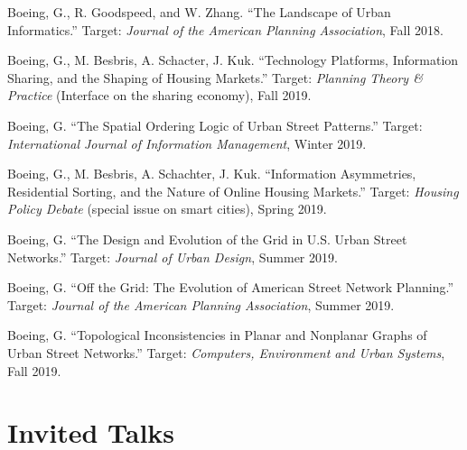 \documentclass[12pt,letterpaper]{report}
\begin{document}
\begin{tablist}

\item[\the\year] \tab Boeing, G., R. Goodspeed, and W. Zhang. \enquote{The Landscape of Urban Informatics.} Target: \textit{Journal of the American Planning Association}, Fall 2018.

\item[\the\year] \tab Boeing, G., M. Besbris, A. Schacter, J. Kuk. \enquote{Technology Platforms, Information Sharing, and the Shaping of Housing Markets.} Target: \textit{Planning Theory \& Practice} (Interface on the sharing economy), Fall 2019.

\item[\the\year] \tab Boeing, G. \enquote{The Spatial Ordering Logic of Urban Street Patterns.} Target: \textit{International Journal of Information Management}, Winter 2019.

\item[\the\year] \tab Boeing, G., M. Besbris, A. Schachter, J. Kuk. \enquote{Information Asymmetries, Residential Sorting, and the Nature of Online Housing Markets.} Target: \textit{Housing Policy Debate} (special issue on smart cities), Spring 2019.

\item[\the\year] \tab Boeing, G. \enquote{The Design and Evolution of the Grid in U.S. Urban Street Networks.} Target: \textit{Journal of Urban Design}, Summer 2019.

\item[\the\year] \tab Boeing, G. \enquote{Off the Grid: The Evolution of American Street Network Planning.} Target: \textit{Journal of the American Planning Association}, Summer 2019.

\item[\the\year] \tab Boeing, G. \enquote{Topological Inconsistencies in Planar and Nonplanar Graphs of Urban Street Networks.} Target: \textit{Computers, Environment and Urban Systems}, Fall 2019.

\end{tablist}



\section*{Invited Talks}
\end{document}
